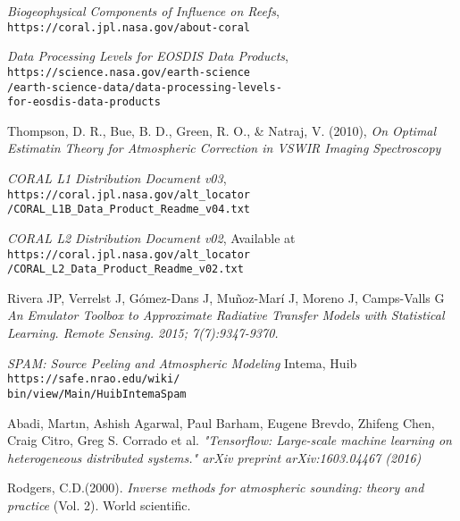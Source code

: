 \documentclass{article}
\begin{document}
\begin{multicols*}{2}
\begin{thebibliography}{10}
\emph{Biogeophysical Components of Influence on Reefs},
\texttt{https://coral.jpl.nasa.gov/about-coral}

\emph{Data Processing Levels for EOSDIS Data Products},
\texttt{https://science.nasa.gov/earth-science\\/earth-science-data/data-processing-levels-\\for-eosdis-data-products}

Thompson, D. R., Bue, B. D., Green, R. O., \& Natraj, V. (2010), 
\emph{On Optimal Estimatin Theory for Atmospheric Correction in VSWIR Imaging Spectroscopy}

\emph{CORAL L1 Distribution Document v03},
\texttt{https://coral.jpl.nasa.gov/alt\_locator\\/CORAL\_L1B\_Data\_Product\_Readme\_v04.txt}

\emph{CORAL L2 Distribution Document v02},
Available at 
\texttt{https://coral.jpl.nasa.gov/alt\_locator\\/CORAL\_L2\_Data\_Product\_Readme\_v02.txt}

Rivera JP, Verrelst J, Gómez-Dans J, Muñoz-Marí J, Moreno J, Camps-Valls G
\emph{An Emulator Toolbox to Approximate Radiative Transfer Models with Statistical Learning. Remote Sensing. 2015; 7(7):9347-9370.}

\emph{SPAM: Source Peeling and Atmospheric Modeling}
Intema, Huib
\texttt{https://safe.nrao.edu/wiki/\\bin/view/Main/HuibIntemaSpam}

Abadi, Martın, Ashish Agarwal, Paul Barham, Eugene Brevdo, Zhifeng Chen, Craig Citro, Greg S. Corrado et al.
\emph{"Tensorflow: Large-scale machine learning on heterogeneous distributed systems." arXiv preprint arXiv:1603.04467 (2016)}

Rodgers, C.D.(2000).
\emph{Inverse methods for atmospheric sounding: theory and practice} (Vol. 2). World scientific.

\end{thebibliography}
\end{multicols*}
\end{document}
